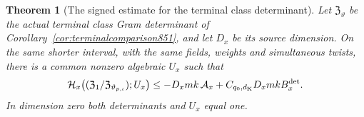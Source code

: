 \documentclass[a4paper,11pt]{article}
\newtheorem{theorem}[proposition]{Theorem}
\theoremstyle{definition}
\theoremstyle{remark}
\numberwithin{equation}{section}
\begin{document}
\begin{theorem}[The signed estimate for the terminal class determinant]
\leavevmode\label{thm:terminaldirection866}
Let \(\mathfrak Z_\vartheta\) be the actual terminal class Gram
determinant of Corollary~\ref{cor:terminalcomparison851}, and
let \(D_x\) be its source dimension. On the same shorter
interval, with the same fields, weights and simultaneous
twists, there is a common nonzero algebraic \(U_x\) such that
\begin{equation}
 \mathcal H_x\!\left(
    (\mathfrak Z_1/\mathfrak Z_{\vartheta_{p,\iota}});U_x\right)
       \le -D_x m k\,\mathcal A_x
                         +C_{q_0,d_{\rm K}}D_x m k B_x^{\rm det}.
 \label{eq:terminaldirection866}
\end{equation}
In dimension zero both determinants and \(U_x\) equal one.
\end{theorem}
\end{document}
